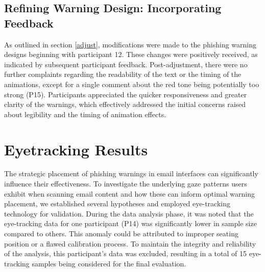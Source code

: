 \documentclass[
  a4paper,  %
  twoside,  %
  bibliography=totoc,
  headsepline,
  cleardoublepage=empty,
  parskip=half,
  draft=false
]{scrbook}
\begin{document}
\subsection{Refining Warning Design: Incorporating Feedback}
As outlined in section \ref{adjust}, modifications were made to the phishing warning designs beginning with participant 12. 
These changes were positively received, as indicated by subsequent participant feedback. Post-adjustment, there were no further complaints regarding the readability of the text or the timing of the animations, except for a single comment about the red tone being potentially too strong (P15). Participants appreciated the quicker responsiveness and greater clarity of the warnings, which effectively addressed the initial concerns raised about legibility and the timing of animation effects. 


\section{Eyetracking Results}
\label{sec:eyetrackingres}
The strategic placement of phishing warnings in email interfaces can significantly influence their effectiveness. To investigate the underlying gaze patterns users exhibit when scanning email content and how these can inform optimal warning placement, we established several hypotheses and employed eye-tracking technology for validation. \newline
During the data analysis phase, it was noted that the eye-tracking data for one participant (P14) was significantly lower in sample size compared to others. This anomaly could be attributed to improper seating position or a flawed calibration process. To maintain the integrity and reliability of the analysis, this participant's data was excluded, resulting in a total of 15 eye-tracking samples being considered for the final evaluation.
\end{document}
